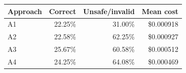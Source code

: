 \begin{tabular}{lrrr}
\toprule
Approach & Correct & Unsafe/invalid & Mean cost \\
\midrule
A1 & 22.25\% & 31.00\% & \$0.000918 \\
A2 & 22.58\% & 62.25\% & \$0.000927 \\
A3 & 25.67\% & 60.58\% & \$0.000512 \\
A4 & 24.25\% & 64.08\% & \$0.000469 \\
\bottomrule
\end{tabular}
